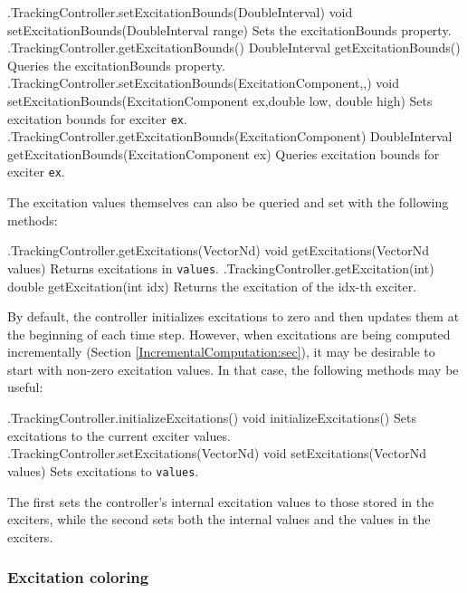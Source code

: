 %
\begin{methodtable}{0.58}{0.42}
\midline
%
\methodentry
{\inverse.TrackingController.setExcitationBounds(DoubleInterval)}%
{void setExcitationBounds(DoubleInterval range)}%
{Sets the excitationBounds property.}%
%
\methodentry
{\inverse.TrackingController.getExcitationBounds()}%
{DoubleInterval getExcitationBounds()}%
{Queries the excitationBounds property.}%
%
\methodspace{0.5em}%
%
\methodentry
{\inverse.TrackingController.setExcitationBounds(ExcitationComponent,,)}%
{void setExcitationBounds(ExcitationComponent ex,\brh double low, double high)}%
{Sets excitation bounds for exciter {\tt ex}.}%
%
\methodentry
{\inverse.TrackingController.getExcitationBounds(ExcitationComponent)}%
{DoubleInterval getExcitationBounds(ExcitationComponent ex)}%
{Queries excitation bounds for exciter {\tt ex}.}%
%
\midline
\end{methodtable}
%

The excitation values themselves can also be queried and set with the following
methods:
%
\begin{methodtable}{0.58}{0.42}
\midline
%
\methodentry
{\inverse.TrackingController.getExcitations(VectorNd)}%
{void getExcitations(VectorNd values)}%
{Returns excitations in {\tt values}.}%
%
\methodentry
{\inverse.TrackingController.getExcitation(int)}%
{double getExcitation(int idx)}%
{Returns the excitation of the idx-th exciter.}%
%
\midline
\end{methodtable}
%

By default, the controller initializes excitations to zero and then updates
them at the beginning of each time step. However, when excitations are being
computed incrementally (Section \ref{IncrementalComputation:sec}), it may be
desirable to start with non-zero excitation values. In that case, the following
methods may be useful:
%
\begin{methodtable}{0.58}{0.42}
\midline
%
\methodentry
{\inverse.TrackingController.initializeExcitations()}%
{void initializeExcitations()}%
{Sets excitations to the current exciter values.}%
%
\methodentry
{\inverse.TrackingController.setExcitations(VectorNd)}%
{void setExcitations(VectorNd values)}%
{Sets excitations to {\tt values}.}%
%
\midline
\end{methodtable}
%
The first sets the controller's internal excitation values to those stored in
the exciters, while the second sets both the internal values and the values in
the exciters.

\subsubsection{Excitation coloring}
\label{ExcitationColoring:sec}

